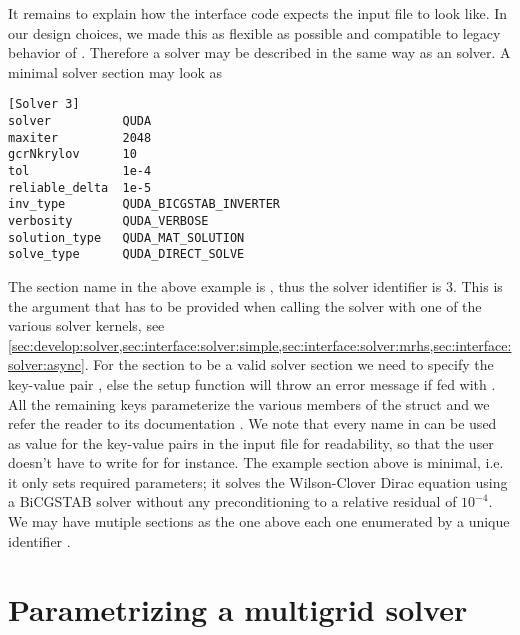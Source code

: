 It remains to explain how the \quda interface code expects the input file to look like.
In our design choices, we made this as flexible as possible and compatible to legacy behavior of \openqxd.
Therefore a \quda solver may be described in the same way as an \openqcd solver.
A minimal solver section may look as
\begin{verbatim}
[Solver 3]
solver          QUDA
maxiter         2048
gcrNkrylov      10
tol             1e-4
reliable_delta  1e-5
inv_type        QUDA_BICGSTAB_INVERTER
verbosity       QUDA_VERBOSE
solution_type   QUDA_MAT_SOLUTION
solve_type      QUDA_DIRECT_SOLVE
\end{verbatim}
The section name in the above example is , thus the solver identifier is \num{3}.
This is the argument  that has to be provided when calling the solver with one of the various solver kernels, see \cref{sec:develop:solver,sec:interface:solver:simple,sec:interface:solver:mrhs,sec:interface:solver:async}.
For the section to be a valid \quda solver section we need to specify the key-value pair , else the setup function will throw an error message if fed with .
All the remaining keys parameterize the various members of the  struct and we refer the reader to its documentation \cite{QUDApaper,github:quda}.
We note that every name in  can be used as value for the key-value pairs in the input file for readability, so that the user doesn't have to write  for  for instance.
The example section above is minimal, i.e. it only sets required parameters; it solves the Wilson-Clover Dirac equation using a BiCGSTAB solver without any preconditioning to a relative residual of $10^{-4}$.
We may have mutiple sections as the one above each one enumerated by a unique identifier .

\section{Parametrizing a multigrid solver}
\label{sec:running:multgrid}

